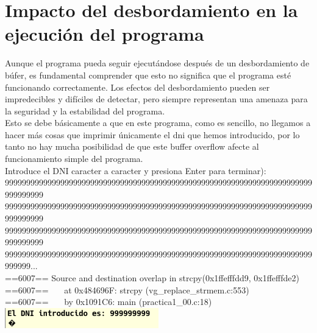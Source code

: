 \section{Impacto del desbordamiento en la ejecución del programa}
\noindent Aunque el programa pueda seguir ejecutándose después de un desbordamiento de búfer, es fundamental comprender que esto no significa que el programa esté funcionando correctamente. Los efectos del desbordamiento pueden ser impredecibles y difíciles de detectar, pero siempre representan una amenaza para la seguridad y la estabilidad del programa.
\\
\newline Esto se debe básicamente a que en este programa, como es sencillo, no llegamos a hacer más cosas que imprimir únicamente el dni que hemos introducido, por lo tanto no hay mucha posibilidad de que este buffer overflow afecte al funcionamiento simple del programa.
\\
\newline 
Introduce el DNI caracter a caracter y presiona Enter para terminar): 
\\
999999999999999999999999999999999999999999999999999999999999999999999999999999999
\\999999999999999999999999999999999999999999999999999999999999999999999999999999999
\\999999999999999999999999999999999999999999999999999999999999999999999999999999999
\\999999999999999999999999999999999999999999999999999999999999999999999999999999...
\\
==6007== Source and destination overlap in strcpy(0x1ffefffdd9, 0x1ffefffde2) 
\\
==6007==    at 0x484696F: strcpy (vg\_replace\_strmem.c:553) 
\\
==6007==    by 0x1091C6: main (practica1\_00.c:18) 
\\
\includegraphics[width=0.5\textwidth]{mainmatter/Fotos Codigo/imagenimagem.png}

